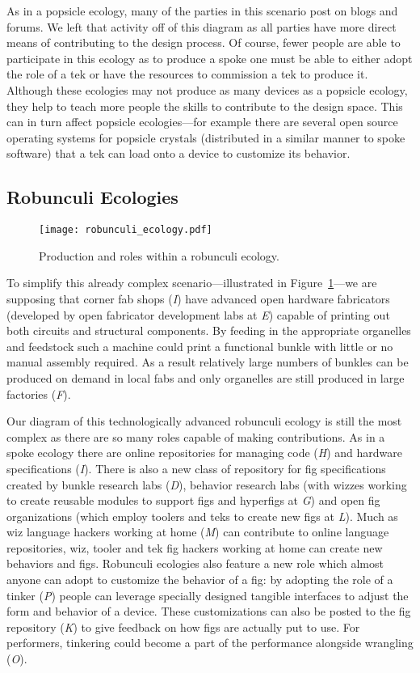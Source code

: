 As in a popsicle ecology, many of the parties in this scenario post on blogs and forums. We left that activity off of this diagram as all parties have more direct means of contributing to the design process. Of course, fewer people are able to participate in this ecology as to produce a spoke one must be able to either adopt the role of a tek or have the resources to commission a tek to produce it. Although these ecologies may not produce as many devices as a popsicle ecology, they help to teach more people the skills to contribute to the design space. This can in turn affect popsicle ecologies---for example there are several open source operating systems for popsicle crystals (distributed in a similar manner to spoke software) that a tek can load onto a device to customize its behavior.

\subsection{Robunculi Ecologies}
%
\begin{figure}[b!]
  \centering
    \texttt{[image: robunculi\_ecology.pdf]}
  \caption{Production and roles within a robunculi ecology.}
  \label{fig:robunculi_ecology}
\end{figure}
%
To simplify this already complex scenario---illustrated in Figure~\ref{fig:robunculi_ecology}---we are supposing that corner fab shops (\emph{I}) have advanced open hardware fabricators (developed by open fabricator development labs at \emph{E}) capable of printing out both circuits and structural components.
By feeding in the appropriate organelles and feedstock such a machine could print a functional bunkle with little or no manual assembly required.
As a result relatively large numbers of bunkles can be produced on demand in local fabs and only organelles are still produced in large factories (\emph{F}).

Our diagram of this technologically advanced robunculi ecology is still the most complex as there are so many roles capable of making contributions. 
As in a spoke ecology there are online repositories for managing code (\emph{H}) and hardware specifications (\emph{I}).
There is also a new class of repository for fig specifications created by bunkle research labs (\emph{D}), behavior research labs (with wizzes working to create reusable modules to support figs and hyperfigs at \emph{G}) and open fig organizations (which employ toolers and teks to create new figs at \emph{L}). 
Much as wiz language hackers working at home (\emph{M}) can contribute to online language repositories, wiz, tooler and tek fig hackers working at home can create new behaviors and figs.
Robunculi ecologies also feature a new role which almost anyone can adopt to customize the behavior of a fig: by adopting the role of a tinker (\emph{P}) people can leverage specially designed tangible interfaces to adjust the form and behavior of a device. 
These customizations can also be posted to the fig repository (\emph{K}) to give feedback on how figs are actually put to use.
For performers, tinkering could become a part of the performance alongside wrangling (\emph{O}).

